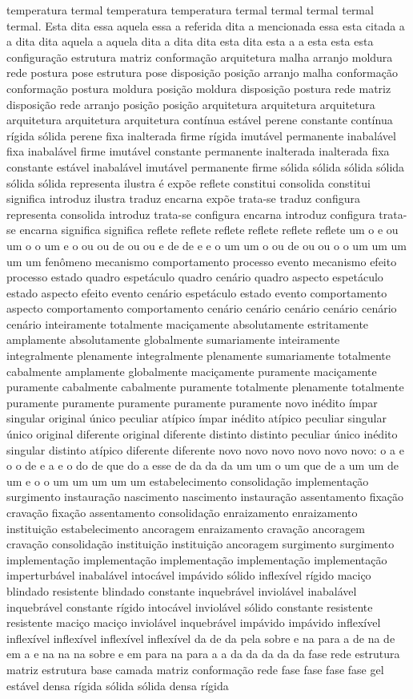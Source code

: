 temperatura termal temperatura temperatura termal termal termal termal termal. Esta dita essa aquela essa a referida dita a mencionada essa esta citada a a dita dita aquela a aquela dita a dita dita esta dita esta a a esta esta esta configuração estrutura matriz conformação arquitetura malha arranjo moldura rede postura pose estrutura pose disposição posição arranjo malha conformação conformação postura moldura posição moldura disposição postura rede matriz disposição rede arranjo posição posição arquitetura arquitetura arquitetura arquitetura arquitetura arquitetura contínua estável perene constante contínua rígida sólida perene fixa inalterada firme rígida imutável permanente inabalável fixa inabalável firme imutável constante permanente inalterada inalterada fixa constante estável inabalável imutável permanente firme sólida sólida sólida sólida sólida sólida representa ilustra é expõe reflete constitui consolida constitui significa introduz ilustra traduz encarna expõe trata-se traduz configura representa consolida introduz trata-se configura encarna introduz configura trata-se encarna significa significa reflete reflete reflete reflete reflete reflete um o e ou um o o um e o ou ou de ou ou e de de e e o um um o ou de ou ou o o um um um um um fenômeno mecanismo comportamento processo evento mecanismo efeito processo estado quadro espetáculo quadro cenário quadro aspecto espetáculo estado aspecto efeito evento cenário espetáculo estado evento comportamento aspecto comportamento comportamento cenário cenário cenário cenário cenário cenário inteiramente totalmente maciçamente absolutamente estritamente amplamente absolutamente globalmente sumariamente inteiramente integralmente plenamente integralmente plenamente sumariamente totalmente cabalmente amplamente globalmente maciçamente puramente maciçamente puramente cabalmente cabalmente puramente totalmente plenamente totalmente puramente puramente puramente puramente puramente novo inédito ímpar singular original único peculiar atípico ímpar inédito atípico peculiar singular único original diferente original diferente distinto distinto peculiar único inédito singular distinto atípico diferente diferente novo novo novo novo novo novo: o a e o o de e a e o do de que do a esse de da da da um um o um que de a um um de um e o o um um um um um estabelecimento consolidação implementação surgimento instauração nascimento nascimento instauração assentamento fixação cravação fixação assentamento consolidação enraizamento enraizamento instituição estabelecimento ancoragem enraizamento cravação ancoragem cravação consolidação instituição instituição ancoragem surgimento surgimento implementação implementação implementação implementação implementação imperturbável inabalável intocável impávido sólido inflexível rígido maciço blindado resistente blindado constante inquebrável inviolável inabalável inquebrável constante rígido intocável inviolável sólido constante resistente resistente maciço maciço inviolável inquebrável impávido impávido inflexível inflexível inflexível inflexível inflexível da de da pela sobre e na para a de na de em a e na na na sobre e em para na para a a da da da da da fase rede estrutura matriz estrutura base camada matriz conformação rede fase fase fase fase gel estável densa rígida sólida sólida densa rígida 